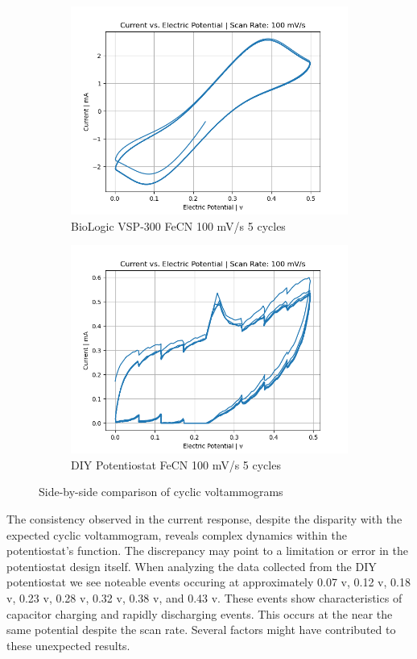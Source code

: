 \documentclass{article}
\begin{document}
\begin{figure}[H]
\begin{subfigure}[b]{0.45\textwidth}
\includegraphics[width=\textwidth]{FECN_100mVs_5cycles_lab.png}
\caption{BioLogic VSP-300 FeCN 100 mV/s 5 cycles}
\end{subfigure}
\hfill
\begin{subfigure}[b]{0.45\textwidth}
\includegraphics[width=\textwidth]{FECN_100mVs_5cycles.png}
\caption{DIY Potentiostat FeCN 100 mV/s 5 cycles}
\end{subfigure}
\caption{Side-by-side comparison of cyclic voltammograms}
\end{figure}


The consistency observed in the current response, despite the disparity with the expected cyclic voltammogram, reveals complex dynamics within the potentiostat's function. The discrepancy may point to a limitation or error in the potentiostat design itself. When analyzing the data collected from the DIY potentiostat we see noteable events occuring at approximately 0.07 v, 0.12 v, 0.18 v, 0.23 v, 0.28 v, 0.32 v, 0.38 v, and 0.43 v. These events show characteristics of capacitor charging and rapidly discharging events. This occurs at the near the same potential despite the scan rate. Several factors might have contributed to these unexpected results.
\end{document}

